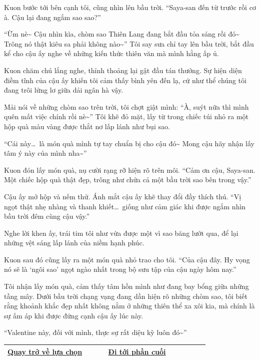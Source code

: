 \documentclass[../main.tex]{subfiles}
\begin{document}
Kuon bước tới bên cạnh tôi, cũng nhìn lên bầu trời. ``Saya-san đến từ trước rồi cơ à. Cậu lại đang ngắm sao sao?''

``Ừm nè\~{} Cậu nhìn kìa, chòm sao Thiên Lang đang bắt đầu tỏa sáng rồi đó\~{} Trông nó thật kiêu sa phải không nào\~{}'' Tôi say sưa chỉ tay lên bầu trời, bắt đầu kể cho cậu ấy nghe về những kiến thức thiên văn mà mình hằng ấp ủ.

Kuon chăm chú lắng nghe, thỉnh thoảng lại gật đầu tán thưởng. Sự hiện diện điềm tĩnh của cậu ấy khiến tôi cảm thấy bình yên đến lạ, cứ như thể chúng tôi đang trôi lửng lơ giữa dải ngân hà vậy.

Mải nói về những chòm sao trên trời, tôi chợt giật mình: ``À, suýt nữa thì mình quên mất việc chính rồi nè\~{}'' Tôi khẽ đỏ mặt, lấy từ trong chiếc túi nhỏ ra một hộp quà màu vàng được thắt nơ lấp lánh như bụi sao.

``Cái này\dots\ là món quà mình tự tay chuẩn bị cho cậu đó\~{} Mong cậu hãy nhận lấy tâm ý này của mình nha\~{}''

Kuon đón lấy món quà, nụ cười rạng rỡ hiện rõ trên môi. ``Cảm ơn cậu, Saya-san. Một chiếc hộp quà thật đẹp, trông như chứa cả một bầu trời sao bên trong vậy.''

Cậu ấy mở hộp và nếm thử. Ánh mắt cậu ấy khẽ thay đổi đầy thích thú. ``Vị ngọt thật nhẹ nhàng và thanh khiết\dots\ giống như cảm giác khi được ngắm nhìn bầu trời đêm cùng cậu vậy.''

Nghe lời khen ấy, trái tim tôi như vừa được một vì sao băng lướt qua, để lại những vệt sáng lấp lánh của niềm hạnh phúc.

Kuon sau đó cũng lấy ra một món quà nhỏ trao cho tôi. ``Của cậu đây. Hy vọng nó sẽ là `ngôi sao' ngọt ngào nhất trong bộ sưu tập của cậu ngày hôm nay.''

Tôi nhận lấy món quà, cảm thấy tâm hồn mình như đang bay bổng giữa những tầng mây. Dưới bầu trời chạng vạng đang dần hiện rõ những chòm sao, tôi biết rằng khoảnh khắc đẹp nhất không nằm ở những thiên thể xa xôi kia, mà chính là sự ấm áp khi được đứng cạnh cậu ấy lúc này.

``Valentine này, đối với mình, thực sự rất diệu kỳ luôn đó\~{}''

\begin{table}[H]
  \centering
  \setlength{\arrayrulewidth}{1pt}
  \begin{tabular}{|>{\centering\arraybackslash}p{0.4\linewidth}|>{\centering\arraybackslash}p{0.4\linewidth}|}
    \hline
    \hyperref[choice]{Quay trở về lựa chọn} & \hyperref[ending]{Đi tới phần cuối} \\ \hline
  \end{tabular}
\end{table}
\end{document}
